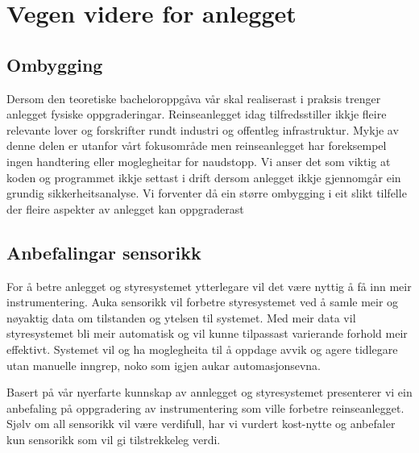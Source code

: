 \section{Vegen videre for anlegget}
\thispagestyle{fancy}

\subsection{Ombygging}

Dersom den teoretiske bacheloroppgåva vår skal realiserast i praksis trenger anlegget fysiske oppgraderingar.
Reinseanlegget idag tilfredsstiller ikkje fleire relevante lover og forskrifter rundt industri og offentleg infrastruktur.
Mykje av denne delen er utanfor vårt fokusområde men reinseanlegget har foreksempel ingen handtering eller moglegheitar for naudstopp.
Vi anser det som viktig at koden og programmet ikkje settast i drift dersom anlegget ikkje gjennomgår ein grundig sikkerheitsanalyse.
Vi forventer då ein større ombygging i eit slikt tilfelle der fleire aspekter av anlegget kan oppgraderast

\newpage

\subsection{Anbefalingar sensorikk}

For å betre anlegget og styresystemet ytterlegare vil det være nyttig å få inn meir instrumentering. 
Auka sensorikk vil forbetre styresystemet ved å samle meir og nøyaktig data om tilstanden og ytelsen til systemet. 
Med meir data vil styresystemet bli meir automatisk og vil kunne tilpassast varierande forhold meir effektivt. 
Systemet vil og ha moglegheita til å oppdage avvik og agere tidlegare utan manuelle inngrep, noko som igjen aukar automasjonsevna.

Basert på vår nyerfarte kunnskap av annlegget og styresystemet presenterer vi ein
anbefaling på oppgradering av instrumentering som ville forbetre reinseanlegget. 
Sjølv om all sensorikk vil være verdifull, har vi vurdert kost-nytte og anbefaler kun sensorikk som vil gi tilstrekkeleg verdi.

